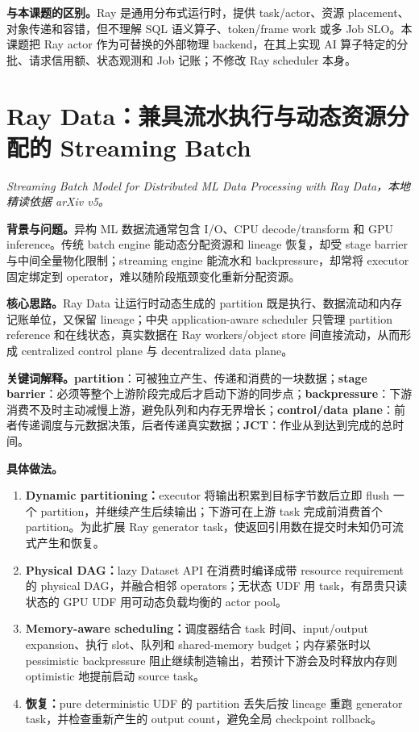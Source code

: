\documentclass[10pt,a4paper]{ctexart}
\let\digestoriginalsection\section
\renewcommand{\section}{\Needspace{7\baselineskip}\digestoriginalsection}
\newcommand{\paperinfo}[1]{\textit{#1}\par}
\newcommand{\field}[1]{\par\noindent\textbf{#1。}\hspace{0.25em}}
\begin{document}
\field{与本课题的区别}Ray 是通用分布式运行时，提供 task/actor、资源 placement、对象传递和容错，但不理解 SQL 语义算子、token/frame work 或多 Job SLO。本课题把 Ray actor 作为可替换的外部物理 backend，在其上实现 AI 算子特定的分批、请求信用额、状态观测和 Job 记账；不修改 Ray scheduler 本身。

\section{Ray Data：兼具流水执行与动态资源分配的 Streaming Batch}
\paperinfo{Streaming Batch Model for Distributed ML Data Processing with Ray Data，本地精读依据 arXiv v5。}

\field{背景与问题}异构 ML 数据流通常包含 I/O、CPU decode/transform 和 GPU inference。传统 batch engine 能动态分配资源和 lineage 恢复，却受 stage barrier 与中间全量物化限制；streaming engine 能流水和 backpressure，却常将 executor 固定绑定到 operator，难以随阶段瓶颈变化重新分配资源。

\field{核心思路}Ray Data 让运行时动态生成的 partition 既是执行、数据流动和内存记账单位，又保留 lineage；中央 application-aware scheduler 只管理 partition reference 和在线状态，真实数据在 Ray workers/object store 间直接流动，从而形成 centralized control plane 与 decentralized data plane。

\field{关键词解释}\textbf{partition}：可被独立产生、传递和消费的一块数据；\textbf{stage barrier}：必须等整个上游阶段完成后才启动下游的同步点；\textbf{backpressure}：下游消费不及时主动减慢上游，避免队列和内存无界增长；\textbf{control/data plane}：前者传递调度与元数据决策，后者传递真实数据；\textbf{JCT}：作业从到达到完成的总时间。

\field{具体做法}
\begin{enumerate}
  \item \textbf{Dynamic partitioning：}executor 将输出积累到目标字节数后立即 flush 一个 partition，并继续产生后续输出；下游可在上游 task 完成前消费首个 partition。为此扩展 Ray generator task，使返回引用数在提交时未知仍可流式产生和恢复。
  \item \textbf{Physical DAG：}lazy Dataset API 在消费时编译成带 resource requirement 的 physical DAG，并融合相邻 operators；无状态 UDF 用 task，有昂贵只读状态的 GPU UDF 用可动态负载均衡的 actor pool。
  \item \textbf{Memory-aware scheduling：}调度器结合 task 时间、input/output expansion、执行 slot、队列和 shared-memory budget；内存紧张时以 pessimistic backpressure 阻止继续制造输出，若预计下游会及时释放内存则 optimistic 地提前启动 source task。
  \item \textbf{恢复：}pure deterministic UDF 的 partition 丢失后按 lineage 重跑 generator task，并检查重新产生的 output count，避免全局 checkpoint rollback。
\end{enumerate}
\end{document}
